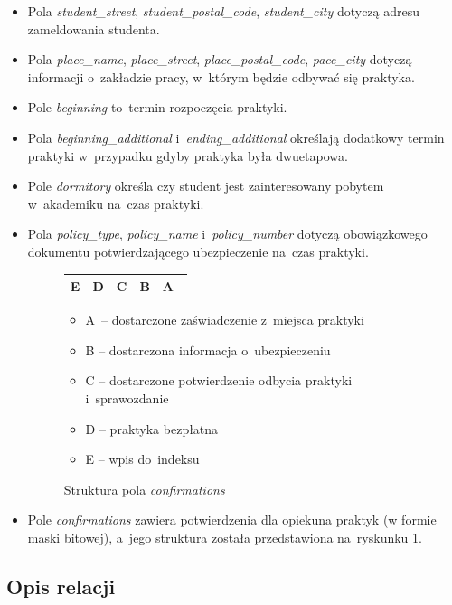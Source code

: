 \documentclass[a4paper,12pt,oneside]{report}
\begin{document}
\begin{itemize}
  \item Pola \emph{student\_street}, \emph{student\_postal\_code}, \emph{student\_city} dotyczą adresu zameldowania studenta.
  \item Pola \emph{place\_name}, \emph{place\_street}, \emph{place\_postal\_code}, \emph{pace\_city} dotyczą informacji o~zakładzie pracy, w~którym będzie odbywać się praktyka.
  \item Pole \emph{beginning} to~termin rozpoczęcia praktyki.
  \item Pola \emph{beginning\_additional} i~\emph{ending\_additional} określają dodatkowy termin praktyki w~przypadku gdyby praktyka była dwuetapowa.
  \item Pole \emph{dormitory} określa czy student jest zainteresowany pobytem w~akademiku na~czas praktyki.
  \item Pola \emph{policy\_type}, \emph{policy\_name} i~\emph{policy\_number} dotyczą obowiązkowego dokumentu potwierdzającego ubezpieczenie na~czas praktyki.

\begin{figure}[h]
  \centering
  \begin{tabular}{|c|c|c|c|c|}\hline
  E & D & C & B & A~\\\hline
  \end{tabular}
  \begin{itemize}
    \item A~-- dostarczone zaświadczenie z~miejsca praktyki
    \item B -- dostarczona informacja o~ubezpieczeniu
    \item C -- dostarczone potwierdzenie odbycia praktyki i~sprawozdanie
    \item D -- praktyka bezpłatna
    \item E -- wpis do~indeksu
  \end{itemize}
  \caption{Struktura pola \emph{confirmations}\label{fig:confirmations}}
\end{figure}

  \item Pole \emph{confirmations} zawiera potwierdzenia dla opiekuna praktyk (w formie maski bitowej), a~jego struktura została przedstawiona na~ryskunku \ref{fig:confirmations}.
\end{itemize}


\subsection{Opis relacji}
\label{sub:relacje}
\end{document}
